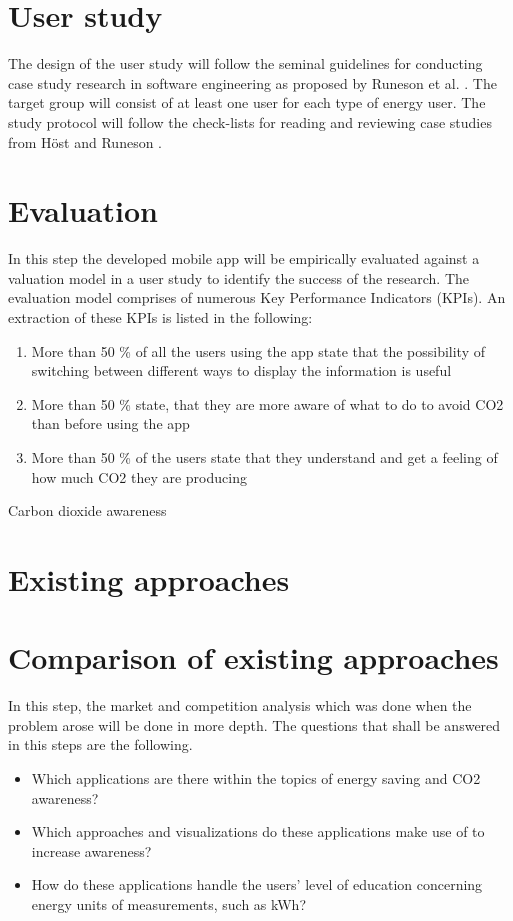 \section{User study}
The design of the user study will follow the seminal guidelines for conducting case study research in software engineering as proposed by Runeson et al. \cite{runeson2012case}. The target group will consist of at least one user for each type of energy user. The study protocol will follow the check-lists for reading and reviewing case studies from H\"ost and Runeson \cite{host2007checklists}.

\section{Evaluation}
In this step the developed mobile app will be empirically evaluated against a valuation model in a user study to identify the success of the research. The evaluation model comprises of numerous Key Performance Indicators (KPIs). An extraction of these KPIs is listed in the following:
\begin{enumerate}
	\item More than 50 \% of all the users using the app state that the possibility of switching between different ways to display the information is useful
	\item More than 50 \% state, that they are more aware of what to do to avoid CO2 than before using the app
	\item More than 50 \% of the users state that they understand and get a feeling of how much CO2 they are producing
\end{enumerate}


Carbon dioxide awareness

\cite{mohammadmoradieffectiveness}

\section{Existing approaches}

\section{Comparison of existing approaches}
In this step, the market and competition analysis which was done when the problem arose will be done in more depth. The questions that shall be answered in this steps are the following.
\begin{itemize}
	\item Which applications are there within the topics of energy saving and CO2 awareness?
	\item Which approaches and visualizations do these applications make use of to increase awareness?
	\item How do these applications handle the users' level of education concerning energy units of measurements, such as kWh?
\end{itemize}

